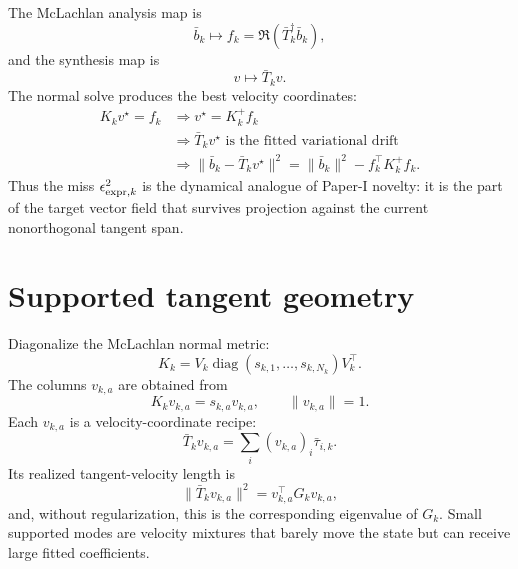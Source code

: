 \documentclass[10pt,twocolumn]{article}
\newcommand{\diag}{\operatorname{diag}}
\begin{document}
The McLachlan analysis map is
\begin{equation}
\bar b_k\longmapsto f_k=\Re(\bar T_k^\dagger\bar b_k),
\label{eq:p2_analysis}
\end{equation}
and the synthesis map is
\begin{equation}
v\longmapsto\bar T_kv.
\label{eq:p2_synthesis_map}
\end{equation}
The normal solve produces the best velocity coordinates:
\begin{equation}
\begin{aligned}
K_kv^\star=f_k
&\Longrightarrow v^\star=K_k^+f_k\\
&\Longrightarrow \bar T_kv^\star
\text{ is the fitted variational drift}\\
&\Longrightarrow
\|\bar b_k-\bar T_kv^\star\|^2
=\|\bar b_k\|^2-f_k^\top K_k^+f_k.
\end{aligned}
\label{eq:p2_chain}
\end{equation}
Thus the miss \(\epsilon_{{\rm expr},k}^2\) is the dynamical analogue of Paper-I novelty: it is the part of the target vector field that survives projection against the current nonorthogonal tangent span.

\section{Supported tangent geometry}

Diagonalize the McLachlan normal metric:
\begin{equation}
K_k=V_k\diag(s_{k,1},\ldots,s_{k,N_k})V_k^\top.
\label{eq:p2_eigs}
\end{equation}
The columns \(v_{k,a}\) are obtained from
\begin{equation}
K_kv_{k,a}=s_{k,a}v_{k,a},
\qquad \|v_{k,a}\|=1.
\label{eq:p2_eigenproblem}
\end{equation}
Each \(v_{k,a}\) is a velocity-coordinate recipe:
\begin{equation}
\bar T_kv_{k,a}=\sum_i(v_{k,a})_i\bar\tau_{i,k}.
\label{eq:p2_mode_synthesis}
\end{equation}
Its realized tangent-velocity length is
\begin{equation}
\|\bar T_kv_{k,a}\|^2
=v_{k,a}^\top G_kv_{k,a},
\label{eq:p2_mode_length_G}
\end{equation}
and, without regularization, this is the corresponding eigenvalue of \(G_k\). Small supported modes are velocity mixtures that barely move the state but can receive large fitted coefficients.
\end{document}
